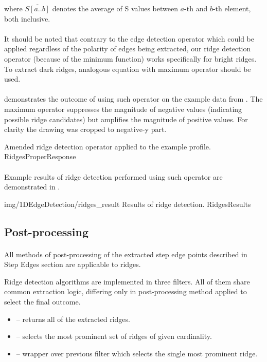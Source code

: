 where $\overline{S[a..b]}$ denotes the average of S values between $a$-th and $b$-th element, both inclusive.

\paragraph*{}
It should be noted that contrary to the edge detection operator which could be applied regardless of the polarity of edges being extracted, our ridge detection operator (because of the minimum function) works specifically for bright ridges. To extract dark ridges, analogous equation with maximum operator should be used.

\paragraph*{}
 demonstrates the outcome of using such operator on the example data from . The maximum operator suppresses the magnitude of negative values (indicating possible ridge candidates) but amplifies the magnitude of positive values. For clarity the drawing was cropped to negative-y part.

\profileFigure
{
}
{Amended ridge detection operator applied to the example profile.}
{RidgesProperResponse}

\paragraph*{}
Example results of ridge detection performed using such operator are demonstrated in .

\oneFigure
{img/1DEdgeDetection/ridges_result}
{Results of ridge detection.}
{RidgesResults}
{\basicWidth}

\subsection{Post-processing}

\paragraph*{}
All methods of post-processing of the extracted step edge points described in Step Edges section are applicable to ridges. 

\begin{refImpl}
Ridge detection algorithms are implemented in three \studio filters. All of them share common extraction logic, differing only in post-processing method applied to select the final outcome.
\begin{itemize}
	\item {} -- returns all of the extracted ridges.
	\item {} -- selects the most prominent set of ridges of given cardinality.
	\item {} -- wrapper over previous filter which selects the single most prominent ridge.
\end{itemize} 
\end{refImpl}
